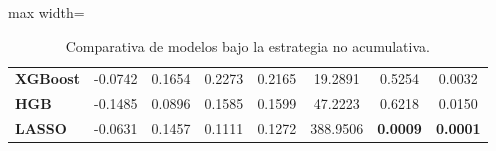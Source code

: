 \begin{table}[H]
\begin{adjustbox}{max width=\textwidth}
\begin{tabular}{l cccc ccc}
            \textbf{XGBoost} & -0.0742                                                        & 0.1654          & 0.2273          & 0.2165          & 19.2891          & 0.5254          & 0.0032          \\
            \textbf{HGB}     & -0.1485                                                        & 0.0896          & 0.1585          & 0.1599          & 47.2223          & 0.6218          & 0.0150          \\
            \textbf{LASSO}   & -0.0631                                                        & 0.1457          & 0.1111          & 0.1272          & 388.9506         & \textbf{0.0009} & \textbf{0.0001} \\
            \bottomrule
        \end{tabular}
    \end{adjustbox}
    \caption{Comparativa de modelos bajo la estrategia no acumulativa.}
    \label{tab:comparativa_modelos_bloques_informativos}
\end{table}